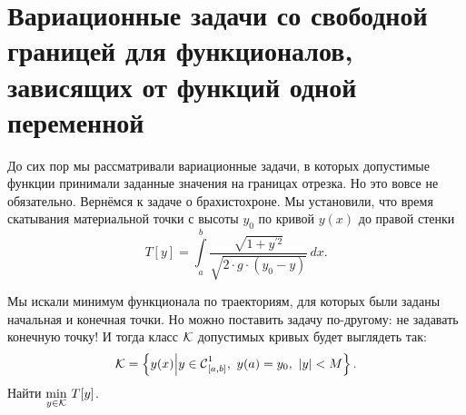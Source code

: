 \section[Задачи со свободными концами]{Вариационные задачи со свободной границей для функционалов, зависящих от функций одной переменной}
\label{lecture3section2}
До сих пор мы рассматривали вариационные задачи, в которых допустимые функции принимали заданные значения на границах отрезка. Но это вовсе не обязательно. Вернёмся к задаче о брахистохроне. Мы установили, что время скатывания материальной точки с высоты $y_0$ по кривой $y(x)$ до правой стенки 
\begin{equation*}
	 T[y]=\int\limits_a^b\frac{\sqrt{1+y^{\prime2}}}{\sqrt{2\cdot g\cdot(y_0-y)}}\,dx.
\end{equation*}
\begin{figure}[H]\centering
{} %

\caption{}
\label{l3:fig:1}
\end{figure}
Мы искали минимум функционала по траекториям, для которых были заданы начальная и конечная точки. Но можно поставить задачу по-другому: не задавать конечную точку! И тогда класс $\mathcal{K}$ допустимых кривых будет выглядеть так:
\begin{equation*}
	\K=\left\{y(x)\middle|y\in\Cfn[{[a,b]}]{1},\ y(a)=y_0,\ |y|<M\right\}.
\end{equation*}
Найти $\displaystyle\min\limits_{y\in\mathcal{K}}\,T[y]$.

